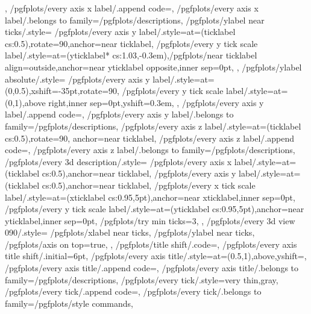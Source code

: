 {{	},%
	/pgfplots/every axis x label/.append code={},
	/pgfplots/every axis x label/.belongs to family=/pgfplots/descriptions,
	/pgfplots/ylabel near ticks/.style={%
		/pgfplots/every axis y label/.style={at={(ticklabel cs:0.5)},rotate=90,anchor=near ticklabel},%
		/pgfplots/every y tick scale label/.style={at={(yticklabel* cs:1.03,-0.3em)},/pgfplots/near ticklabel align=outside,anchor=near yticklabel opposite,inner sep=0pt},
	},%
	/pgfplots/ylabel absolute/.style={%
		/pgfplots/every axis y label/.style={at={(0,0.5)},xshift=-35pt,rotate=90},
		/pgfplots/every y tick scale label/.style={at={(0,1)},above right,inner sep=0pt,yshift=0.3em},
	},%
	/pgfplots/every axis y label/.append code={},
	/pgfplots/every axis y label/.belongs to family=/pgfplots/descriptions,
	/pgfplots/every axis z label/.style={at={(ticklabel cs:0.5)},rotate=90, anchor=near ticklabel},
	/pgfplots/every axis z label/.append code={},
	/pgfplots/every axis z label/.belongs to family=/pgfplots/descriptions,
	/pgfplots/every 3d description/.style={%
		/pgfplots/every axis x label/.style={at={(ticklabel cs:0.5)},anchor=near ticklabel},%
		/pgfplots/every axis y label/.style={at={(ticklabel cs:0.5)},anchor=near ticklabel},%
		/pgfplots/every x tick scale label/.style={at={(xticklabel cs:0.95,5pt)},anchor=near xticklabel,inner sep=0pt},
		/pgfplots/every y tick scale label/.style={at={(yticklabel cs:0.95,5pt)},anchor=near yticklabel,inner sep=0pt},
		/pgfplots/try min ticks=3,%
	},%
	/pgfplots/every 3d view {0}{90}/.style={%
		/pgfplots/xlabel near ticks,%
		/pgfplots/ylabel near ticks,%
		/pgfplots/axis on top=true,%
	},%
	/pgfplots/title shift/.code={},%
	/pgfplots/every axis title shift/.initial=6pt,
	/pgfplots/every axis title/.style={at={(0.5,1)},above,yshift=},
	/pgfplots/every axis title/.append code={},
	/pgfplots/every axis title/.belongs to family=/pgfplots/descriptions,
	/pgfplots/every tick/.style={very thin,gray},
	/pgfplots/every tick/.append code={},
	/pgfplots/every tick/.belongs to family=/pgfplots/style commands,
}
